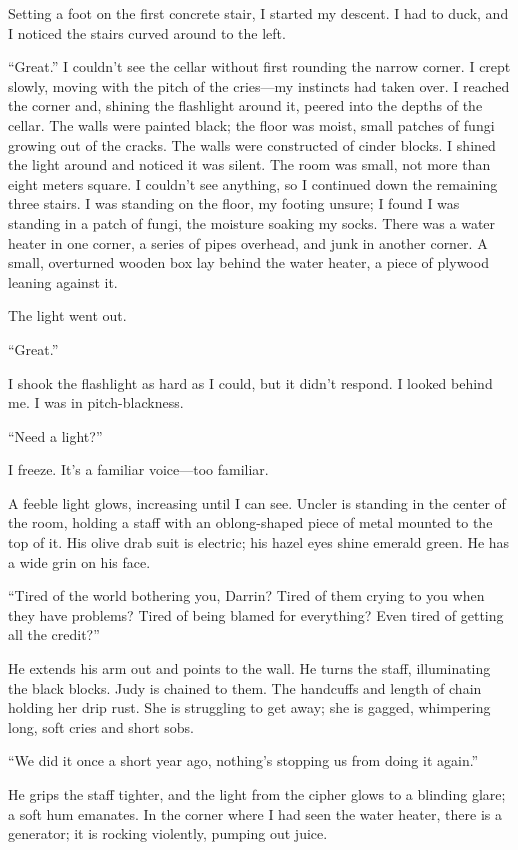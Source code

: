 Setting a foot on the first concrete stair, I started my descent. I had
to duck, and I noticed the stairs curved around to the left.

``Great.'' I couldn't see the cellar without first rounding the narrow
corner. I crept slowly, moving with the pitch of the cries---my
instincts had taken over. I reached the corner and, shining the
flashlight around it, peered into the depths of the cellar. The walls
were painted black; the floor was moist, small patches of fungi growing
out of the cracks. The walls were constructed of cinder blocks. I shined
the light around and noticed it was silent. The room was small, not more
than eight meters square. I couldn't see anything, so I continued down
the remaining three stairs. I was standing on the floor, my footing
unsure; I found I was standing in a patch of fungi, the moisture soaking
my socks. There was a water heater in one corner, a series of pipes
overhead, and junk in another corner. A small, overturned wooden box lay
behind the water heater, a piece of plywood leaning against it.

The light went out.

``Great.''

I shook the flashlight as hard as I could, but it didn't respond. I
looked behind me. I was in pitch-blackness.

``Need a light?''

I freeze. It's a familiar voice---too familiar.

A feeble light glows, increasing until I can see. Uncler is standing in
the center of the room, holding a staff with an oblong-shaped piece of
metal mounted to the top of it. His olive drab suit is electric; his
hazel eyes shine emerald green. He has a wide grin on his face.

``Tired of the world bothering you, Darrin? Tired of them crying to you
when they have problems? Tired of being blamed for everything? Even
tired of getting all the credit?''

He extends his arm out and points to the wall. He turns the staff,
illuminating the black blocks. Judy is chained to them. The handcuffs
and length of chain holding her drip rust. She is struggling to get
away; she is gagged, whimpering long, soft cries and short sobs.

``We did it once a short year ago, nothing's stopping us from doing it
again.''

He grips the staff tighter, and the light from the cipher glows to a
blinding glare; a soft hum emanates. In the corner where I had seen the
water heater, there is a generator; it is rocking violently, pumping out
juice.

